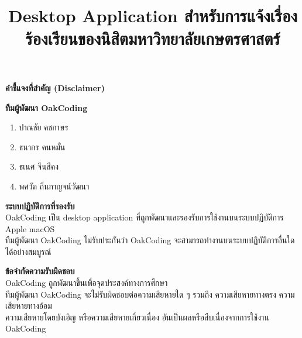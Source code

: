 \documentclass{article}
\title{%
\fontsize{32pt}{\baselineskip}\flushleft\textbf{\docsname}\\
\vspace{1ex}
\fontsize{22pt}{\baselineskip}\ourTeam\\
\vspace{3ex}
\large Desktop Application สำหรับการแจ้งเรื่องร้องเรียนของนิสิตมหาวิทยาลัยเกษตรศาสตร์}
\author{}
\date{}
\begin{document}
\begin{titlepage}
\maketitle
\thispagestyle{empty}
\vspace{1ex}


\rule{0em}{2ex}

\LARGE \textbf{คำชี้แจงที่สำคัญ (Disclaimer)} \normalsize

\rule{0em}{3ex}

\large \textbf{ทีมผู้พัฒนา OakCoding} \normalsize

\begin{enumerate}
    \setlength{\itemsep}{0.7pt}
    \item ปาณชัย คชกาษร
    \item ธนากร คนหมั่น
    \item ธเนศ จีนสีคง
    \item พศวัต ถิ่นกาญจน์วัฒนา
\end{enumerate}

\rule{0em}{3ex}

\large \textbf{ระบบปฏิบัติการที่รองรับ} \normalsize\\
OakCoding เป็น desktop application ที่ถูกพัฒนาและรองรับการใช้งานบนระบบปฏิบัติการ Apple macOS\\
ทีมผู้พัฒนา OakCoding ไม่รับประกันว่า OakCoding จะสามารถทำงานบนระบบปฏิบัติการอื่นใดได้อย่างสมบูรณ์

\rule{0em}{3ex}

\large \textbf{ข้อจำกัดความรับผิดชอบ} \normalsize\\
OakCoding ถูกพัฒนาขึ้นเพื่อจุดประสงค์ทางการศึกษา\\
ทีมผู้พัฒนา OakCoding จะไม่รับผิดชอบต่อความเสียหายใด ๆ รวมถึง ความเสียหายทางตรง ความเสียหายทางอ้อม\\
ความเสียหายโดยบังเอิญ หรือความเสียหายเกี่ยวเนื่อง อันเป็นผลหรือสืบเนื่องจากการใช้งาน OakCoding
\end{titlepage}

\clearpage

\thispagestyle{empty}
\tableofcontents
\restoregeometry
\newpage



\clearpage



\clearpage



\clearpage



\clearpage



\clearpage
\end{document}
